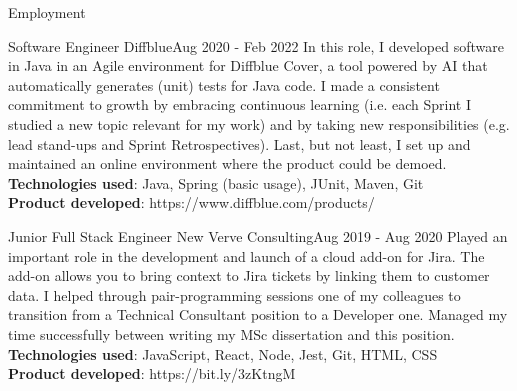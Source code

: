 \documentclass[]{mcdowellcv}
\begin{document}
\begin{cvsection}{Employment}
   	    \begin{cvsubsection}{Software Engineer }{Diffblue}{Aug 2020 - Feb 2022 }
			\hspace{\parindent} \hspace{\parindent} \hspace{\parindent} \hspace{\parindent} In this role, I developed software in Java in an Agile environment for Diffblue Cover, a tool powered by AI that automatically generates (unit) tests for Java code. I made a consistent commitment to growth by embracing continuous learning (i.e. each Sprint I studied a new topic relevant for my work) and by taking new responsibilities (e.g. lead stand-ups and Sprint Retrospectives). Last, but not least, I set up and maintained an online environment where the product could be demoed.
      		\\ \textbf{Technologies used}: Java, Spring (basic usage), JUnit, Maven, Git
	  		\\ \textbf{Product developed}: https://www.diffblue.com/products/
		\end{cvsubsection}

		\begin{cvsubsection}{Junior Full Stack Engineer }{New Verve Consulting}{Aug 2019 - Aug 2020} 
			\hspace{\parindent} \hspace{\parindent} \hspace{\parindent} \hspace{\parindent} Played an important role in the development and launch of a cloud add-on for Jira. The add-on allows you to bring context to Jira tickets by linking them to customer data. I helped through pair-programming sessions one of my colleagues to transition from a Technical Consultant position to a Developer one. Managed my time successfully between writing my MSc dissertation and this position.
      		\\ \textbf{Technologies used}: JavaScript, React, Node, Jest, Git, HTML, CSS
	  		\\ \textbf{Product developed}: https://bit.ly/3zKtngM
		\end{cvsubsection}



\end{cvsection}
\end{document}
